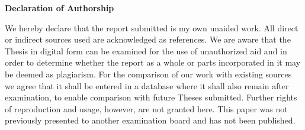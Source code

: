 \documentclass[12pt]{article}
\begin{document}
\Large
\noindent
\textbf{Declaration of Authorship} 
\vspace{0.5cm}
\noindent
\normalsize

We hereby declare that the report submitted is my own unaided work. All direct 
or indirect sources used are acknowledged as references. We are aware that the Thesis in digital form can be examined for the use of unauthorized aid and in order to determine whether the report as a whole or parts incorporated in it may be deemed as plagiarism. For the comparison of our work with existing sources we 
agree that it shall be entered in a database where it shall also remain after 
examination, to enable comparison with future Theses submitted. Further rights 
of reproduction and usage, however, are not granted here. This paper was not 
previously presented to another examination board and has not been published. 

\end{document}
